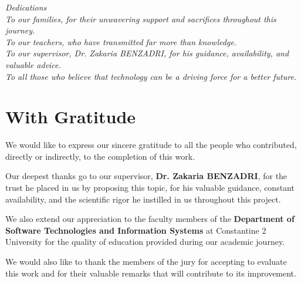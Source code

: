 \newpage
\thispagestyle{empty}
\vspace*{\fill}
\begin{center}
	{\large \textit{Dedications}}\\[2cm]
	
	\textit{To our families, for their unwavering support and sacrifices throughout this journey.}\\[1cm]
	
	\textit{To our teachers, who have transmitted far more than knowledge.}\\[1cm]
	
	\textit{To our supervisor, Dr. Zakaria BENZADRI, for his guidance, availability, and valuable advice.}\\[1cm]
	
	\textit{To all those who believe that technology can be a driving force for a better future.}\\[1cm]
	
\end{center}
\vspace*{\fill}

\newpage
\thispagestyle{empty}
\chapter*{With Gratitude}

We would like to express our sincere gratitude to all the people who contributed, directly or indirectly, to the completion of this work.

Our deepest thanks go to our supervisor, \textbf{Dr. Zakaria BENZADRI}, for the trust he placed in us by proposing this topic, for his valuable guidance, constant availability, and the scientific rigor he instilled in us throughout this project.

We also extend our appreciation to the faculty members of the \textbf{Department of Software Technologies and Information Systems} at Constantine 2 University for the quality of education provided during our academic journey.

We would also like to thank the members of the jury for accepting to evaluate this work and for their valuable remarks that will contribute to its improvement.

